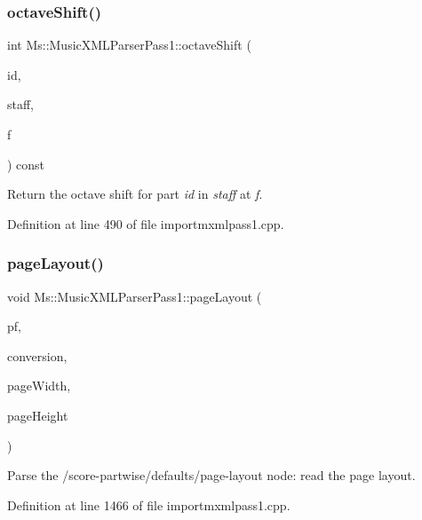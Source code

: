 \subsubsection{\texorpdfstring{octave\+Shift()}{octaveShift()}}
{\footnotesize\ttfamily int Ms\+::\+Music\+X\+M\+L\+Parser\+Pass1\+::octave\+Shift (\begin{DoxyParamCaption}\item[{const Q\+String \&}]{id,  }\item[{const int}]{staff,  }\item[{const \hyperlink{class_ms_1_1_fraction}{Fraction}}]{f }\end{DoxyParamCaption}) const}

Return the octave shift for part {\itshape id} in {\itshape staff} at {\itshape f}. 

Definition at line 490 of file importmxmlpass1.\+cpp.

\mbox{\label{class_ms_1_1_music_x_m_l_parser_pass1_ace07d590acdb0a0f933225af36b775a2}} 
\subsubsection{\texorpdfstring{page\+Layout()}{pageLayout()}}
{\footnotesize\ttfamily void Ms\+::\+Music\+X\+M\+L\+Parser\+Pass1\+::page\+Layout (\begin{DoxyParamCaption}\item[{\hyperlink{class_ms_1_1_page_format}{Page\+Format} \&}]{pf,  }\item[{const qreal}]{conversion,  }\item[{int \&}]{page\+Width,  }\item[{int \&}]{page\+Height }\end{DoxyParamCaption})}

Parse the /score-\/partwise/defaults/page-\/layout node\+: read the page layout. 

Definition at line 1466 of file importmxmlpass1.\+cpp.

\mbox{\label{class_ms_1_1_music_x_m_l_parser_pass1_abed4dea5b7f1b7f2d44a782e7f2abfe5}} 
